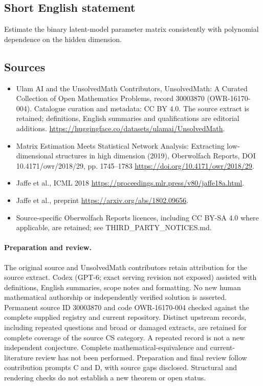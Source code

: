 \documentclass[11pt]{article}
\begin{document}
\subsection{Short English statement}
Estimate the binary latent-model parameter matrix consistently with polynomial dependence on the hidden dimension.
\subsection{Sources}
\begin{itemize}
\item[\hypertarget{source:30003870:1}{S1}] Ulam AI and the UnsolvedMath Contributors, UnsolvedMath: A Curated Collection of Open Mathematics Problems, record 30003870 (OWR-16170-004). Catalogue curation and metadata: CC BY 4.0. The source extract is retained; definitions, English summaries and qualifications are editorial additions.
\url{https://huggingface.co/datasets/ulamai/UnsolvedMath}.
\item[\hypertarget{source:30003870:2}{S2}] Matrix Estimation Meets Statistical Network Analysis: Extracting low-dimensional structures in high dimension (2019), Oberwolfach Reports, DOI 10.4171/owr/2018/29, pp. 1745--1783
\url{https://doi.org/10.4171/owr/2018/29}.
\item[\hypertarget{source:30003870:3}{S3}] Jaffe et al., ICML 2018
\url{https://proceedings.mlr.press/v80/jaffe18a.html}.
\item[\hypertarget{source:30003870:4}{S4}] Jaffe et al., preprint
\url{https://arxiv.org/abs/1802.09656}.
\item Source-specific Oberwolfach Reports licences, including CC BY-SA 4.0 where applicable, are retained; see THIRD\_PARTY\_NOTICES.md.
\end{itemize}
\paragraph{Preparation and review.}
The original source and UnsolvedMath contributors retain attribution for the source extract. Codex (GPT-6; exact serving revision not exposed) assisted with definitions, English summaries, scope notes and formatting. No new human mathematical authorship or independently verified solution is asserted. Permanent source ID 30003870 and code OWR-16170-004 checked against the complete supplied registry and current repository. Distinct upstream records, including repeated questions and broad or damaged extracts, are retained for complete coverage of the source CS category. A repeated record is not a new independent conjecture. Complete mathematical-equivalence and current-literature review has not been performed. Preparation and final review follow contribution prompts C and D, with source gaps disclosed. Structural and rendering checks do not establish a new theorem or open status.
\label{end:30003870}
\end{document}
